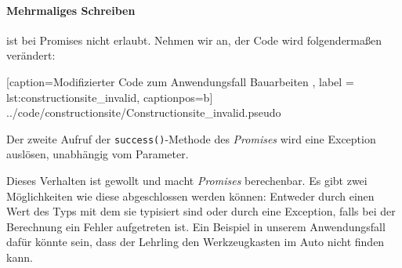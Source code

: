 \paragraph{Mehrmaliges Schreiben} ist bei Promises nicht erlaubt.
Nehmen wir an, der Code wird folgendermaßen verändert:


    [caption={Modifizierter Code zum Anwendungsfall \glqq Bauarbeiten\grqq{} },
       label = lst:constructionsite_invalid,
       captionpos=b]
 {../code/constructionsite/Constructionsite_invalid.pseudo}
 
Der zweite Aufruf der \texttt{success()}-Methode des \emph{Promises}
wird eine Exception auslösen, unabhängig vom Parameter.

Dieses Verhalten ist gewollt und macht \emph{Promises} berechenbar.
Es gibt zwei Möglichkeiten wie diese abgeschlossen werden können:
Entweder durch einen Wert des Typs mit dem sie typisiert sind
oder durch eine Exception, falls bei der Berechnung ein Fehler aufgetreten ist.
Ein Beispiel in unserem Anwendungsfall dafür könnte sein, dass der
Lehrling den Werkzeugkasten im Auto nicht finden kann.
